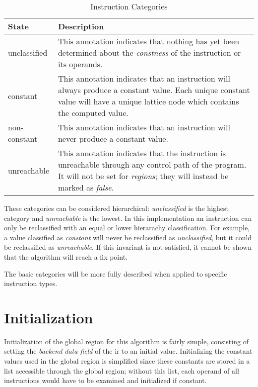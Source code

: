 \begin{table}[h!]
  \begin{tabularx}{\linewidth}{|l|X|}
    \hline State & Description \\

    \hline unclassified & This annotation indicates that nothing has
    yet been determined about the \emph{constness} of the instruction
    or its operands.  \\

    \hline constant & This annotation indicates that an instruction
    will always produce a constant value.  Each unique constant value
    will have a unique lattice node which contains the computed
    value. \\

    \hline non-constant & This annotation indicates that an
    instruction will never produce a constant value. \\

    \hline unreachable & This annotation indicates that the
    instruction is unreachable through any control path of the
    program.  It will not be set for \emph{regions}; they will instead
    be marked as \emph{false}. \\
    \hline
  \end{tabularx}
  \caption{Instruction Categories}\label{table:const-prop-class}
\end{table}

\begin{observation}
  These categories can be considered hierarchical: \emph{unclassified}
  is the highest category and \emph{unreachable} is the lowest.  In
  this implementation an instruction can only be reclassified with an
  equal or lower hierarachy classification.  For example, a value
  classified as \emph{constant} will never be reclassified as
  \emph{unclassified}, but it could be reclassified as
  \emph{unreachable}.  If this invariant is not satisfied, it cannot
  be shown that the algorithm will reach a fix point.
\end{observation}

The basic categories will be more fully described when applied to
specific instruction types.

\section{Initialization}

Initialization of the global region for this algorithm is fairly
simple, consisting of setting the \emph{backend data field} of the
\ac{ir} to an initial value.  Initializing the constant values used in
the global region is simplified since these constants are stored in a
list accessible through the global region; without this list, each
operand of all instructions would have to be examined and initialized
if constant.

